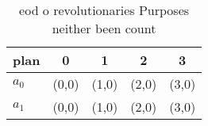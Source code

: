 \documentclass[a4paper]{article}
\begin{document}
\begin{table}
\begin{adjustbox}{width=0.7\columnwidth}
\begin{tabular}{|l|l|l|l|l|}
\hline
\textbf{plan} & \multicolumn{1}{c|}{\textbf{0}} & \multicolumn{1}{c|}{\textbf{1}} & \multicolumn{1}{c|}{\textbf{2}} & \multicolumn{1}{c|}{\textbf{3}} \\ \hline
\textbf{$a_0$}  & (0,0) & (1,0) & (2,0) & (3,0) \\ \hline
\textbf{$a_1$}  & (0,0) & (1,0) & (2,0) & (3,0) \\ \hline
\end{tabular}
\end{adjustbox}
\caption{eod o revolutionaries Purposes neither been count
}
\end{table}
\end{document}
